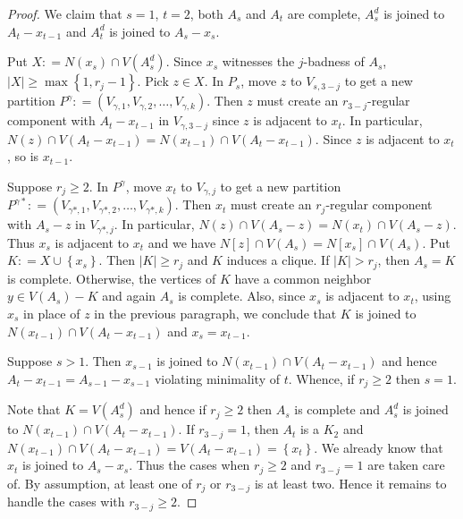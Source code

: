 \documentclass[12pt]{amsart}
\theoremstyle{plain}
\theoremstyle{definition}
\theoremstyle{remark}
\newcommand{\set}[1]{\left\{ #1 \right\}}
\newcommand{\card}[1]{\left|#1\right|}
\newcommand{\parens}[1]{\left( #1 \right)}
\newcommand{\DefinedAs}{\mathrel{\mathop:}=}
\newcommand{\mov}[2]{#1^{#2}}
\begin{document}
\begin{proof}
			We claim that $s = 1$, $t = 2$, both $A_s$ and $A_t$ are complete,
			$\mov{A_s}{d}$ is joined to $A_t - x_{t-1}$ and $\mov{A_t}{d}$ is joined to $A_s - x_s$.
			
			Put $X \DefinedAs N(x_s) \cap V(\mov{A_s}{d})$.  Since $x_s$ witnesses the
			$j$-badness of $A_s$, $\card{X} \geq \max\set{1, r_j - 1}$. Pick $z \in X$.
			In $P_s$, move $z$ to $V_{s, 3-j}$ to get a new partition $P^\gamma \DefinedAs \parens{V_{\gamma,
			1}, V_{\gamma, 2}, \ldots, V_{\gamma, k}}$. Then $z$ must create an
			$r_{3-j}$-regular component with $A_t - x_{t-1}$ in $V_{\gamma, 3-j}$ since
			$z$ is adjacent to $x_t$.  
			In particular, $N(z) \cap V(A_t - x_{t-1}) = N(x_{t-1}) \cap V(A_t -
			x_{t-1})$. Since $z$ is adjacent to $x_t$, so is $x_{t-1}$. 
			
			Suppose $r_j \geq 2$. In $P^\gamma$, move $x_t$ to $V_{\gamma, j}$ to
			get a new partition $P^{\gamma*} \DefinedAs \parens{V_{\gamma*, 1},
			V_{\gamma*, 2}, \ldots, V_{\gamma*, k}}$. Then $x_t$ must create an
			$r_{j}$-regular component with $A_s - z$ in $V_{\gamma*, j}$.  In
			particular, $N(z) \cap V(A_s - z) = N(x_t) \cap V(A_s - z)$.  Thus $x_s$
			is adjacent to $x_t$ and we have $N[z] \cap V(A_s) = N[x_s] \cap
			V(A_s)$. Put $K \DefinedAs X \cup \set{x_s}$.  Then $\card{K} \geq r_j$ and
			$K$ induces a clique.  If $\card{K} > r_j$, then $A_s = K$ is complete. 
			Otherwise, the vertices of $K$ have a common neighbor $y \in V(A_s) - K$ and
			again $A_s$ is complete. Also, since $x_s$ is adjacent to $x_t$, using $x_s$
			in place of $z$ in the previous paragraph, we conclude that $K$
			is joined to $N(x_{t-1}) \cap V(A_t - x_{t-1})$ and $x_s = x_{t-1}$.  
			
			Suppose $s > 1$.  Then $x_{s-1}$ is joined to $N(x_{t-1}) \cap V(A_t -
			x_{t-1})$ and hence $A_t - x_{t-1} = A_{s - 1} - x_{s-1}$ violating
			minimality of $t$.  Whence, if $r_j \geq 2$ then $s = 1$.  
			
			Note that $K = V(\mov{A_s}{d})$ and hence if $r_j \geq 2$ then $A_s$ is
			complete and $\mov{A_s}{d}$ is joined to $N(x_{t-1}) \cap V(A_t - x_{t-1})$.  If $r_{3-j}
			= 1$, then $A_t$ is a $K_2$ and $N(x_{t-1}) \cap V(A_t - x_{t-1}) = V(A_t -
			x_{t-1}) = \set{x_t}$.  We already know that $x_t$ is joined to $A_s - x_s$. 
			Thus the cases when $r_j \geq 2$ and $r_{3-j} = 1$ are taken care of. By
			assumption, at least one of $r_j$ or $r_{3-j}$ is at least two.  Hence it
			remains to handle the cases with $r_{3-j} \geq 2$.
			

\end{proof}
\end{document}
